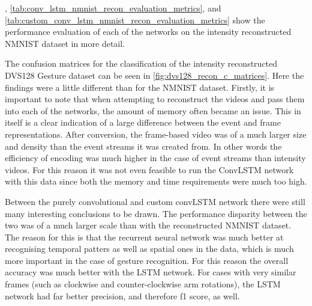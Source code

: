 , \cref{tab:conv_lstm_nmnist_recon_evaluation_metrics}, and \cref{tab:custom_conv_lstm_nmnist_recon_evaluation_metrics} show the performance evaluation of each of the networks on the intensity reconstructed NMNIST dataset in more detail.

\vspace{10pt}

The confusion matrices for the classification of the intensity reconstructed DVS128 Gesture dataset can be seen in \cref{fig:dvs128_recon_c_matrices}. Here the findings were a little different than for the NMNIST dataset. Firstly, it is important to note that when attempting to reconstruct the videos and pass them into each of the networks, the amount of memory often became an issue. This in itself is a clear indication of a large difference between the event and frame representations. After conversion, the frame-based video was of a much larger size and density than the event streams it was created from. In other words the efficiency of encoding was much higher in the case of event streams than intensity videos. For this reason it was not even feasible to run the ConvLSTM network with this data since both the memory and time requirements were much too high.

Between the purely convolutional and custom convLSTM network there were still many interesting conclusions to be drawn. The performance disparity between the two was of a much larger scale than with the reconstructed NMNIST dataset. The reason for this is that the recurrent neural network was much better at recognising temporal patters as well as spatial ones in the data, which is much more important in the case of gesture recognition. For this reason the overall accuracy was much better with the LSTM network. For cases with very similar frames (such as clockwise and counter-clockwise arm rotations), the LSTM network had far better precision, and therefore f1 score, as well.

